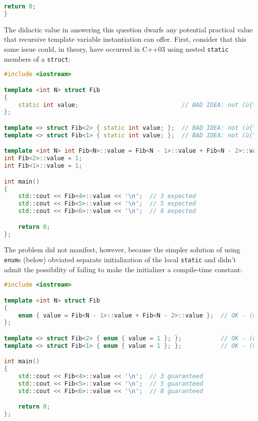 {\begin{lstlisting}[language=C++]
    return 0;
}
\end{lstlisting}
    
\noindent The didactic value in answering this question dwarfs any potential
practical value that recursive template variable instantiation can
offer. First, consider that this same issue could, in theory, have
occurred in C++03 using nested \texttt{static} members of a
\texttt{struct}:

\begin{lstlisting}[language=C++]
#include <iostream>

template <int N> struct Fib
{
    static int value;                             // BAD IDEA: not (ù{\codeincomments{const}}ù)
};

template <> struct Fib<2> { static int value; };  // BAD IDEA: not (ù{\codeincomments{const}}ù)
template <> struct Fib<1> { static int value; };  // BAD IDEA: not (ù{\codeincomments{const}}ù)

template <int N> int Fib<N>::value = Fib<N - 1>::value + Fib<N - 2>::value;
int Fib<2>::value = 1;
int Fib<1>::value = 1;

int main()
{
    std::cout << Fib<4>::value << '\n';  // 3 expected
    std::cout << Fib<5>::value << '\n';  // 5 expected
    std::cout << Fib<6>::value << '\n';  // 8 expected

    return 0;
};
\end{lstlisting}
    
\noindent The problem did not manifest, however, because the simpler solution of
using \texttt{enum}s (below) obviated separate initialization of the
local \texttt{static} and didn't admit the possibility of failing to
make the initializer a compile-time constant:

\begin{lstlisting}[language=C++]
#include <iostream>

template <int N> struct Fib
{
    enum { value = Fib<N - 1>::value + Fib<N - 2>::value };  // OK - (ù{\codeincomments{const}}ù)
};

template <> struct Fib<2> { enum { value = 1 }; };           // OK - (ù{\codeincomments{const}}ù)
template <> struct Fib<1> { enum { value = 1 }; };           // OK - (ù{\codeincomments{const}}ù)

int main()
{
    std::cout << Fib<4>::value << '\n';  // 3 guaranteed
    std::cout << Fib<5>::value << '\n';  // 5 guaranteed
    std::cout << Fib<6>::value << '\n';  // 8 guaranteed

    return 0;
};
\end{lstlisting}
    
}
